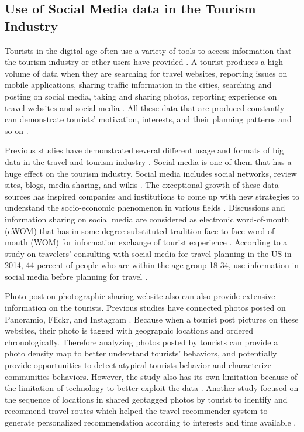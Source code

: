 \documentclass[sigconf]{acmart}
\begin{document}
\subsection{Use of Social Media data in the Tourism Industry}
Tourists in the digital age often use a variety of tools to access information that
the tourism industry or other users have provided \cite{XIANG2015120}. A tourist
produces a high volume of data when they are searching for travel websites, reporting
issues on mobile applications, sharing traffic information in the cities, searching and
posting on social media, taking and sharing photos, reporting experience on travel
websites and social media \cite{akerkar2012, Shafiee16}. All these data that are
produced constantly can demonstrate tourists' motivation, interests, and their
planning patterns and so on \cite{XIE2017101}.

Previous studies have demonstrated several different usage and formats of big data in
the travel and tourism industry \cite{XIE2017101}. Social media is one of them that
has a huge effect on the tourism industry. Social media includes social networks,
review sites, blogs, media sharing, and wikis \cite{XIANG2015120}. The exceptional
growth of these data sources has inspired companies and institutions to come up with 
new strategies to understand the socio-economic phenomenon in various
fields \cite{Shafiee16}. Discussions and information sharing on social media are
considered as electronic word-of-mouth (eWOM) that has in some degree substituted
tradition face-to-face word-of-mouth (WOM) for information exchange of tourist
experience \cite{chung2009}. According to a study on travelers' consulting with social
media for travel planning in the US in 2014, 44 percent of people who are within the
age group 18-34, use information in social media before planning for travel
\cite{statistica17a}.


Photo post on photographic sharing website also can also provide extensive information
on the tourists. Previous studies have connected photos posted on Panoramio, Flickr,
and Instagram \cite{GJT14, MIAH2017}. Because when a tourist post pictures on these
websites, their photo is tagged with geographic locations and ordered chronologically.
Therefore analyzing photos posted by tourists can provide a photo density map to
better understand tourists' behaviors, and potentially provide opportunities to detect
atypical tourists behavior and characterize communities behaviors. However, the study
also has its own limitation because of the limitation of technology to better exploit
the data \cite{GJT14}. Another study focused on the sequence of locations in shared
geotagged photos by tourist to identify and recommend travel routes which helped the
travel recommender system to generate personalized recommendation according to
interests and time available \cite{kurashima2013travel}. 
\end{document}
